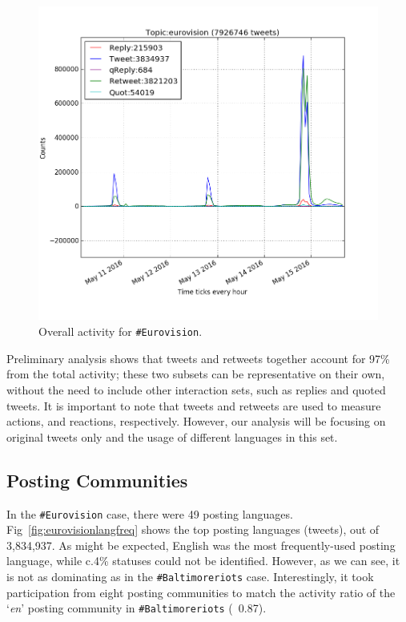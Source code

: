 \begin{figure}[htb]
\centering
\includegraphics[width=\columnwidth]{images/overalleurovisionactivity.png}
\caption{Overall activity for {\texttt{\#Eurovision}}.}
\label{fig:overalleurovisionactivity}
\end{figure}

Preliminary analysis shows that tweets and retweets together account
for 97\% from the total activity; these two subsets can be
representative on their own, without the need to include other
interaction sets, such as replies and quoted tweets. It is important
to note that tweets and retweets are used to measure actions, and
reactions, respectively. However, our analysis will be focusing on
original tweets only and the usage of different languages in this set.

\subsection{Posting Communities}\label{eurovisionpostingcomm}

In the {\texttt{\#Eurovision}} case, there were 49 posting
languages. Fig~\ref{fig:eurovisionlangfreq} shows the top posting
languages (tweets), out of 3,834,937. As might be expected, English
was the most frequently-used posting language, while c.4\% statuses
could not be identified. However, as we can see, it is not as
dominating as in the {\texttt{\#Baltimoreriots}} case. Interestingly,
it took participation from eight posting communities to match the
activity ratio of the `{\emph{en}}' posting community in
{\texttt{\#Baltimoreriots}} (~0.87).

